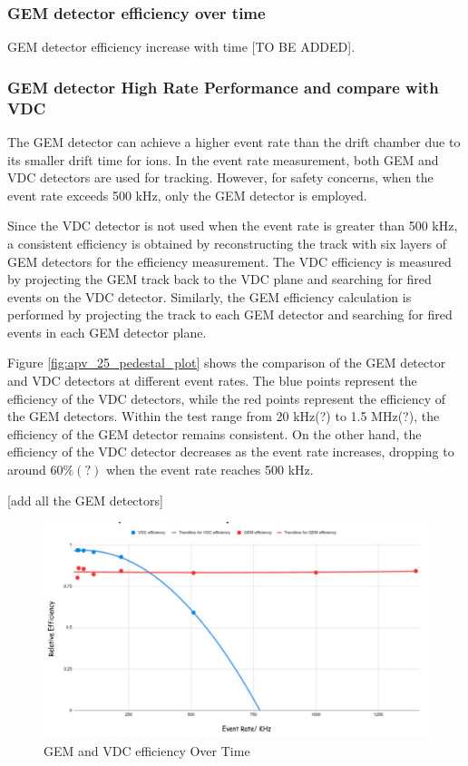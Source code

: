 \subsubsection{GEM detector efficiency over time}

GEM detector efficiency increase with time [TO BE ADDED]. 

\subsubsection{GEM detector High Rate Performance and compare with VDC}

The GEM detector can achieve a higher event rate than the drift chamber due to its smaller drift time for ions. In the event rate measurement, both GEM and VDC detectors are used for tracking. However, for safety concerns, when the event rate exceeds 500 kHz, only the GEM detector is employed.

Since the VDC detector is not used when the event rate is greater than 500 kHz, a consistent efficiency is obtained by reconstructing the track with six layers of GEM detectors for the efficiency measurement. The VDC efficiency is measured by projecting the GEM track back to the VDC plane and searching for fired events on the VDC detector. Similarly, the GEM efficiency calculation is performed by projecting the track to each GEM detector and searching for fired events in each GEM detector plane.

Figure \ref{fig:apv_25_pedestal_plot} shows the comparison of the GEM detector and VDC detectors at different event rates. The blue points represent the efficiency of the VDC detectors, while the red points represent the efficiency of the GEM detectors. Within the test range from 20 kHz(?) to 1.5 MHz(?), the efficiency of the GEM detector remains consistent. On the other hand, the efficiency of the VDC detector decreases as the event rate increases, dropping to around $60\%(?)$ when the event rate reaches 500 kHz. 

[add all the GEM detectors]



\begin{figure}[!htbp]
    \centering
    \includegraphics[width=\textwidth]{images/chap5/gem efficiency over time.png}
    \caption{GEM and VDC efficiency Over Time}
    \label{fig:gem_efficiency_over_time}
\end{figure}